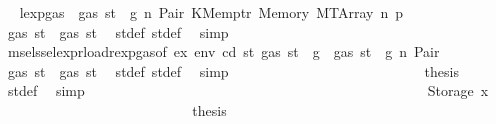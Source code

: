 \begin{isabellebody}
\ \isamarkupfalse%
\ lexp{\isacharunderscore}{\kern0pt}gas\ {\isacharbackquoteopen}{\isasymnot}\ gas\ st\ {\isasymle}\ g{\isacharbackquoteclose}\ n\ Pair\ KMemptr\ Memory\ MTArray\ n{}\ p{}\ \isamarkupfalse%
\ {\isachardoublequoteopen}gas\ st{\isacharprime}{\kern0pt}{\isacharprime}{\kern0pt}{\isacharprime}{\kern0pt}\ {\isasymle}\ gas\ st{\isacharprime}{\kern0pt}{\isacharprime}{\kern0pt}{\isachardoublequoteclose}\ \isamarkupfalse%
\ st{\isacharprime}{\kern0pt}{\isacharprime}{\kern0pt}{\isacharunderscore}{\kern0pt}def\ st{\isacharprime}{\kern0pt}{\isacharprime}{\kern0pt}{\isacharprime}{\kern0pt}{\isacharunderscore}{\kern0pt}def\ \isamarkupfalse%
\ simp\isanewline
\ \ \ \ \ \ \ \ \ \ \ \ \ \ \ \ \ \ \ \ \ \ \ \ \isamarkupfalse%
\ \isamarkupfalse%
\ msel{\isacharunderscore}{\kern0pt}ssel{\isacharunderscore}{\kern0pt}expr{\isacharunderscore}{\kern0pt}load{\isacharunderscore}{\kern0pt}rexp{\isacharunderscore}{\kern0pt}gas{\isacharparenleft}{\kern0pt}{}{\isacharparenright}{\kern0pt}{\isacharbrackleft}{\kern0pt}of\ ex\ env\ cd\ st{\isacharprime}{\kern0pt}\ {\isachardoublequoteopen}gas\ st\ {\isacharminus}{\kern0pt}\ g{\isachardoublequoteclose}{\isacharbrackright}{\kern0pt}\ {\isacharbackquoteopen}{\isasymnot}\ gas\ st\ {\isasymle}\ g{\isacharbackquoteclose}\ n\ Pair\ \isamarkupfalse%
\ {\isachardoublequoteopen}gas\ st{\isacharprime}{\kern0pt}{\isacharprime}{\kern0pt}\ {\isasymle}\ gas\ st{\isacharprime}{\kern0pt}{\isachardoublequoteclose}\ \isamarkupfalse%
\ st{\isacharprime}{\kern0pt}{\isacharunderscore}{\kern0pt}def\ st{\isacharprime}{\kern0pt}{\isacharprime}{\kern0pt}{\isacharunderscore}{\kern0pt}def\ \isamarkupfalse%
\ simp\isanewline
\ \ \ \ \ \ \ \ \ \ \ \ \ \ \ \ \ \ \ \ \ \ \ \ \isamarkupfalse%
\ \isamarkupfalse%
\ {\isacharquery}{\kern0pt}thesis\ \isamarkupfalse%
\ st{\isacharprime}{\kern0pt}{\isacharunderscore}{\kern0pt}def\ \isamarkupfalse%
\ simp\isanewline
\ \ \ \ \ \ \ \ \ \ \ \ \ \ \ \ \ \ \ \ \ \ \isamarkupfalse%
\isanewline
\ \ \ \ \ \ \ \ \ \ \ \ \ \ \ \ \ \ \ \ \ \ \ \ \isamarkupfalse%
\ {\isacharparenleft}{\kern0pt}Storage\ x{}{\isacharparenright}{\kern0pt}\isanewline
\ \ \ \ \ \ \ \ \ \ \ \ \ \ \ \ \ \ \ \ \ \ \ \ \isamarkupfalse%
\ \isamarkupfalse%
\ {\isacharquery}{\kern0pt}thesis\isanewline
\ \ \ \ \ \ \ \ \ \ \ \ \ \ \ \ \ \ \ \ \ \ \ \ \isamarkupfalse%

\end{isabellebody}

